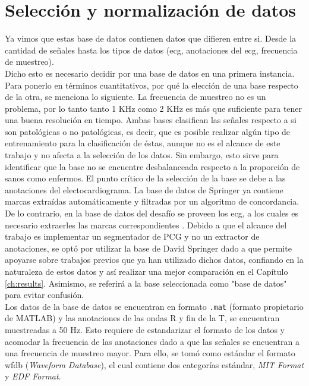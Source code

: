 \section{Selección y normalización de datos} \label{sec:data-selection-normalization}

Ya vimos que estas base de datos contienen datos que difieren entre si. Desde la cantidad de señales hasta los tipos
de datos (\gls{ecg}, anotaciones del \gls{ecg}, frecuencia de muestreo). \\
\indent Dicho esto es necesario decidir por una base de datos en una primera instancia. Para ponerlo en términos
cuantitativos, por qué la elección de una base respecto de la otra, se menciona lo siguiente. La frecuencia de
muestreo no es un problema, por lo tanto tanto 1 KHz como 2 KHz es más que suficiente para tener una buena
resolución en tiempo. Ambas bases clasifican las señales respecto a si son patológicas o no patológicas, es decir,
que es posible realizar algún tipo de entrenamiento para la clasificación de éstas, aunque no es el alcance de este
trabajo y no afecta a la selección de los datos. Sin embargo, esto sirve para identificar que la base no se
encuentre desbalanceada respecto a la proporción de sanos como enfermos. El punto crítico de la selección de la base
se debe a las anotaciones del electocardiograma. La base de datos de Springer \cite{ref:logi-regression-springer} ya
contiene marcas extraídas automáticamente y filtradas por un algoritmo de concordancia. De lo contrario, en la base
de datos del desafío se proveen los \gls{ecg}, a los cuales es necesario extraerles las marcas correspondientes
. Debido a que el alcance del trabajo es implementar un segmentador de PCG y no un extractor de anotaciones, se optó
por utilizar la base de David Springer dado a que permite apoyarse sobre trabajos previos que ya han utilizado
dichos datos, confiando en la naturaleza de estos datos y así realizar una mejor comparación en el Capítulo
\ref{ch:results}. Asimismo, se referirá a la base seleccionada como "base de datos" para evitar confusión. \\
\indent Los datos de la base de datos se encuentran en formato \texttt{.mat} (formato propietario de
\textsc{MATLAB\texttrademark}) y las anotaciones de las ondas R y fin de la T, se encuentran muestreadas a 50 Hz.
Esto requiere de estandarizar el formato de los datos y acomodar la frecuencia de las anotaciones dado a que las
señales se encuentran a una frecuencia de muestreo mayor. Para ello, se tomó como estándar el formato
\gls{wfdb} (\textit{Waveform Database}), el cual contiene dos categorías estándar, \textit{MIT Format} y
\textit{EDF Format}.

